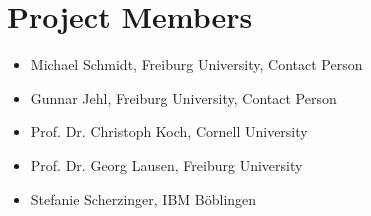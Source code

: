 \section{Project Members}
\begin{itemize}
  \setlength{\itemsep}{0pt}
  \item Michael Schmidt, Freiburg University, Contact Person
  \item Gunnar Jehl, Freiburg University, Contact Person
  \item Prof. Dr. Christoph Koch, Cornell University
  \item Prof. Dr. Georg Lausen, Freiburg University
  \item Stefanie Scherzinger, IBM B\"{o}blingen
\end{itemize} 
